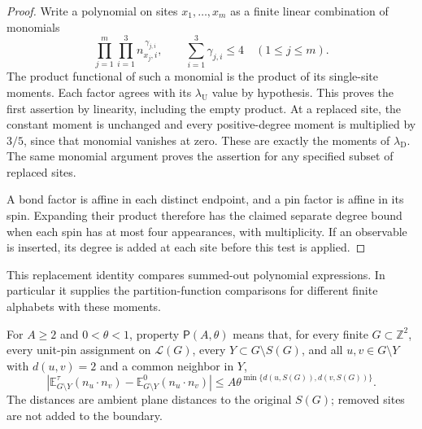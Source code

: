 \begin{proof}
Write a polynomial on sites \(x_1,\ldots,x_m\) as a finite linear
combination of monomials
\[
 \prod_{j=1}^m\prod_{i=1}^3 n_{x_j,i}^{\,\gamma_{j,i}},
 \qquad \sum_{i=1}^3\gamma_{j,i}\le4\quad(1\le j\le m).
\]
The product functional of such a monomial is the product of its
single-site moments. Each factor agrees with its
\(\lambda_{\mathrm U}\) value by hypothesis. This proves the first
assertion by linearity, including the empty product.
At a replaced site, the constant moment is unchanged and every
positive-degree moment is multiplied by \(3/5\), since that
monomial vanishes at zero. These are exactly the moments of
\(\lambda_{\mathrm D}\). The same monomial argument proves the
assertion for any specified subset of replaced sites.

A bond factor is affine in each distinct endpoint, and a pin factor
is affine in its spin. Expanding their product therefore has the
claimed separate degree bound when each spin has at most four
appearances, with multiplicity. If an observable is inserted, its
degree is added at each site before this test is applied.
\end{proof}

This replacement identity compares summed-out polynomial expressions.
In particular it supplies the partition-function comparisons for
different finite alphabets with these moments.

\begin{definition}[(P)]\label{h:P}
For \(A\ge2\) and \(0<\theta<1\), property \(\mathsf P(A,\theta)\)
means that, for every finite \(G\subset\mathbb Z^2\), every unit-pin
assignment on \(\mathcal L(G)\), every
\(Y\subset G\setminus S(G)\), and all \(u,v\in G\setminus Y\) with
\(d(u,v)=2\) and a common neighbor in \(Y\),
\[
 \left|\mathbb E^\tau_{G\setminus Y}(n_u\cdot n_v)
             -\mathbb E^0_{G\setminus Y}(n_u\cdot n_v)\right|
 \le A\theta^{\min\{d(u,S(G)),d(v,S(G))\}} .
\]
The distances are ambient plane distances to the original \(S(G)\);
removed sites are not added to the boundary.
\end{definition}


